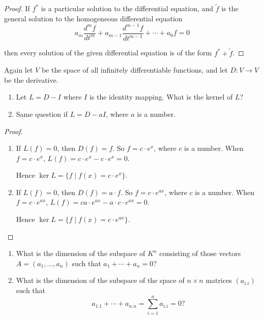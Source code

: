 \begin{proof}
    If $f^{*}$ is a particular solution to the differential equation, and $\tilde{f}$ is the general solution to the homogeneous differential equation
    \[
        a_{m}\frac{d^{m}f}{dt^{m}} + a_{m-1}\frac{d^{m-1}f}{dt^{m-1}} + \cdots + a_{0}f = 0
    \]

    then every solution of the given differential equation is of the form $f^{*} + \tilde{f}$.
\end{proof}

\begin{exercise}
    Again let $V$ be the space of all infinitely differentiable functions, and let $D: V \to V$ be the derivative.
    \begin{enumerate}[label={(\alph*)}]
        \item Let $L = D - I$ where $I$ is the identity mapping. What is the kernel of $L$?
        \item Same question if $L = D - aI$, where $a$ is a number.
    \end{enumerate}
\end{exercise}

\begin{proof}
    \begin{enumerate}[label={(\alph*)}]
        \item If $L(f) = 0$, then $D(f) = f$. So $f = c\cdot e^{x}$, where $c$ is a number. When $f = c\cdot e^{x}$, $L(f) = c\cdot e^{x} - c\cdot e^{x} = 0$.

              Hence $\ker L = \{ f \mid f(x) = c\cdot e^{x} \}$.
        \item If $L(f) = 0$, then $D(f) = a\cdot f$. So $f = c\cdot e^{ax}$, where $c$ is a number. When $f = c\cdot e^{ax}$, $L(f) = ca\cdot e^{ax} - a\cdot c\cdot e^{ax} = 0$.

              Hence $\ker L = \{ f \mid f(x) = c\cdot e^{ax} \}$.
    \end{enumerate}
\end{proof}

\begin{exercise}
    \begin{enumerate}[label={(\alph*)}]
        \item What is the dimension of the subspace of $K^{n}$ consisting of those vectors $A = (a_{1}, \ldots, a_{n})$ such that $a_{1} + \cdots + a_{n} = 0$?
        \item What is the dimension of the subspace of the space of $n\times n$ matrices $(a_{i.i})$ such that
              \[
                  a_{1.1} + \cdots + a_{n.n} = \sum^{n}_{i=1}a_{i.i} = 0?
              \]
    \end{enumerate}
\end{exercise}

